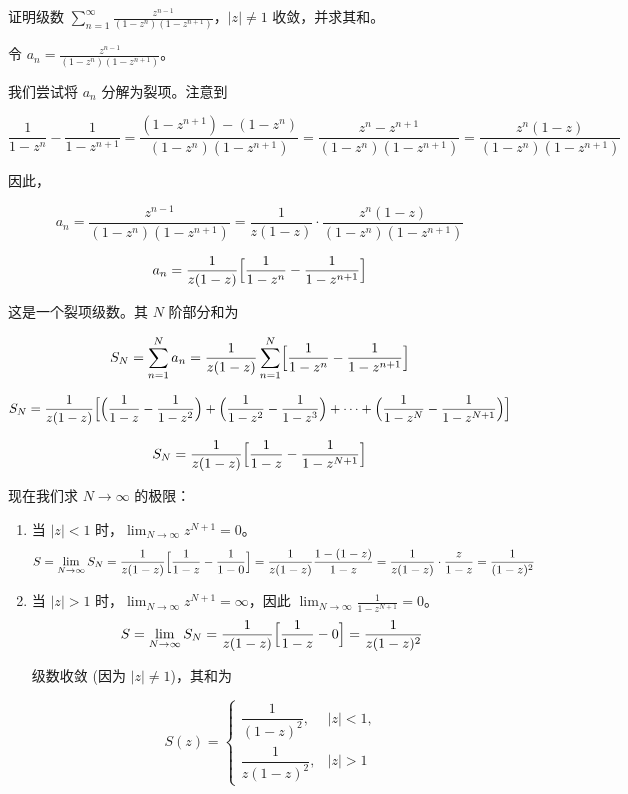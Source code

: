 \begin{question}
证明级数 \(\displaystyle\sum_{n=1}^{\infty} \frac{z^{n-1}}{(1-z^n)(1-z^{n+1})}\)，\(|z|\neq1\) 收敛，并求其和。

\begin{solution}
令 \(\displaystyle a_n = \frac{z^{n-1}}{(1-z^n)(1-z^{n+1})}\)。

我们尝试将 \(a_n\) 分解为裂项。注意到

\[
\frac1{1-z^n} - \frac1{1-z^{n+1}} = \frac{(1-z^{n+1}) - (1-z^n)}{(1-z^n)(1-z^{n+1})} = \frac{z^n - z^{n+1}}{(1-z^n)(1-z^{n+1})} = \frac{z^n (1-z)}{(1-z^n)(1-z^{n+1})}
\]

因此，

\[
a_n = \frac{z^{n-1}}{(1-z^n)(1-z^{n+1})} = \frac1{z(1-z)}\cdot\frac{z^n(1-z)}{(1-z^n)(1-z^{n+1})}
\]

\[
a_n = \frac1{z(1-z)}\Bigl[ \frac1{1-z^n} - \frac1{1-z^{n+1}} \Bigr]
\]

这是一个裂项级数。其 \(N\) 阶部分和为

\[
S_N = \sum_{n=1}^N a_n = \frac1{z(1-z)} \sum_{n=1}^N \Bigl[ \frac1{1-z^n} - \frac1{1-z^{n+1}} \Bigr]
\]

\[
S_N = \frac1{z(1-z)} \Bigl[ \Bigl(\frac1{1-z} - \frac1{1-z^2}\Bigr) + \Bigl(\frac1{1-z^2} - \frac1{1-z^3}\Bigr) + \dots + \Bigl(\frac1{1-z^N} - \frac1{1-z^{N+1}}\Bigr) \Bigr]
\]

\[
S_N = \frac1{z(1-z)} \Bigl[ \frac1{1-z} - \frac1{1-z^{N+1}} \Bigr]
\]

现在我们求 \(N\to\infty\) 的极限：

\begin{enumerate}
  \item 当 \(|z| < 1\) 时，\(\displaystyle\lim_{N\to\infty} z^{N+1} = 0\)。
    \[
    S = \lim_{N\to\infty} S_N = \frac1{z(1-z)} \Bigl[ \frac1{1-z} - \frac1{1-0} \Bigr] = \frac1{z(1-z)} \frac{1-(1-z)}{1-z} = \frac1{z(1-z)}\cdot\frac{z}{1-z} = \frac1{(1-z)^2}
    \]

  \item 当 \(|z| > 1\) 时，\(\displaystyle\lim_{N\to\infty} z^{N+1} = \infty\)，因此 \(\displaystyle\lim_{N\to\infty} \frac1{1-z^{N+1}} = 0\)。
    \[
    S = \lim_{N\to\infty} S_N = \frac1{z(1-z)} \Bigl[ \frac1{1-z} - 0 \Bigr] = \frac1{z(1-z)^2}
    \]

级数收敛 (因为 \(|z|\neq1\))，其和为

\[
S(z) = \begin{cases}
\dfrac1{(1-z)^2}, & |z| < 1,\\[6pt]
\dfrac1{z(1-z)^2}, & |z| > 1
\end{cases}
\]
\end{enumerate}
\end{solution}
\end{question}

